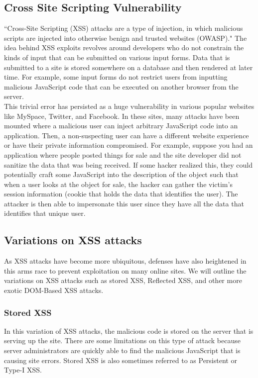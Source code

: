 \documentclass[conference]{IEEEtran}
\begin{document}
\subsection{Cross Site Scripting Vulnerability}

``Cross-Site Scripting (XSS) attacks are a type of injection, in which malicious scripts are injected into otherwise benign and trusted websites (OWASP)." The idea behind XSS exploits revolves around developers who do not constrain the kinds of input that can be submitted on various input forms. Data that is submitted to a site is stored somewhere on a database and then rendered at later time. For example, some input forms do not restrict users from inputting malicious JavaScript code that can be executed on another browser from the server. \\ 

This trivial error has persisted as a huge vulnerability in various popular websites like MySpace, Twitter, and Facebook. In these sites, many attacks have been mounted where a malicious user can inject arbitrary JavaScript code into an application. Then, a non-suspecting user can have a different website experience or have their private information compromised. For example, suppose you had an application where people posted things for sale and the site developer did not sanitize the data that was being received. If some hacker realized this, they could potentially craft some JavaScript into the description of the object such that when a user looks at the object for sale, the hacker can gather the victim's session information (cookie that holds the data that identifies the user). The attacker is then able to impersonate this user since they have all the data that identifies that unique user.

\subsection {Variations on XSS attacks}
As XSS attacks have become more ubiquitous, defenses have also heightened in this arms race to prevent exploitation on many online sites. We will outline the variations on XSS attacks such as stored XSS, Reflected XSS, and other more exotic DOM-Based XSS attacks.\\

\subsubsection{Stored XSS}
In this variation of XSS attacks, the malicious code is stored on the server that is serving up the site. There are some limitations on this type of attack because server administrators are quickly able to find the malicious JavaScript that is causing site errors. Stored XSS is also sometimes referred to as Persistent or Type-I XSS.\\
\end{document}

